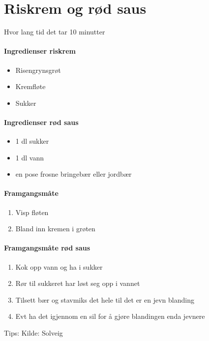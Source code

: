 \section{﻿Riskrem og rød saus}
\label{riskrem}

Hvor lang tid det tar 10 minutter

\paragraph{Ingredienser riskrem}
\begin{itemize}[noitemsep]
	\item Risengrynsgrøt
	\item Kremfløte
	\item Sukker
\end{itemize}

\paragraph{Ingredienser rød saus}
\begin{itemize}[noitemsep]
	\item 1 dl sukker
	\item 1 dl vann
	\item en pose frosne bringebær eller jordbær
\end{itemize}

\paragraph{Framgangsmåte}
\begin{enumerate}[noitemsep]
	\item Visp fløten
	\item Bland inn kremen i grøten
\end{enumerate}

\paragraph{Framgangsmåte rød saus}
\begin{enumerate}[noitemsep]
	\item Kok opp vann og ha i sukker
	\item Rør til sukkeret har løst seg opp i vannet
	\item Tilsett bær og stavmiks det hele til det er en jevn blanding
	\item Evt ha det igjennom en sil for å gjøre blandingen enda jevnere
\end{enumerate}




Tips:
Kilde: Solveig
